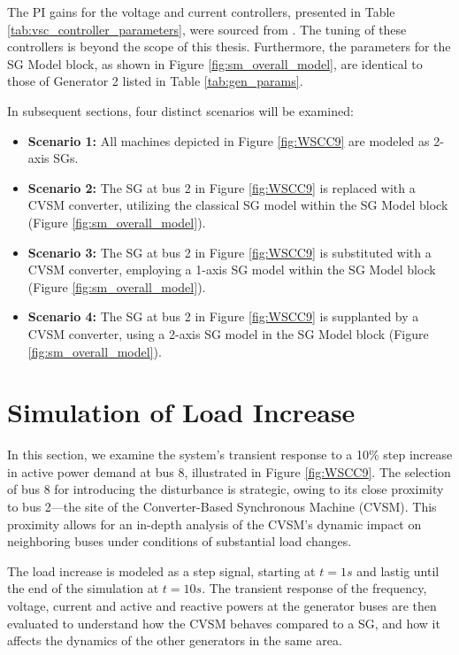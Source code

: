 The PI gains for the voltage and current controllers, presented in Table
\ref{tab:vsc_controller_parameters}, were sourced from \cite{du2020comparative}.
The tuning of these controllers is beyond the scope of this thesis. Furthermore,
the parameters for the SG Model block, as shown in Figure
\ref{fig:sm_overall_model}, are identical to those of Generator 2 listed in
Table \ref{tab:gen_params}.

In subsequent sections, four distinct scenarios will be examined:
\begin{itemize}
    \item \textbf{Scenario 1:} All machines depicted in Figure \ref{fig:WSCC9}
    are modeled as 2-axis SGs.
    \item \textbf{Scenario 2:} The SG at bus 2 in Figure \ref{fig:WSCC9} is
    replaced with a CVSM converter, utilizing the classical SG model within the
    SG Model block (Figure \ref{fig:sm_overall_model}).
    \item \textbf{Scenario 3:} The SG at bus 2 in Figure \ref{fig:WSCC9} is
    substituted with a CVSM converter, employing a 1-axis SG model within the SG
    Model block (Figure \ref{fig:sm_overall_model}).
    \item \textbf{Scenario 4:} The SG at bus 2 in Figure \ref{fig:WSCC9} is
    supplanted by a CVSM converter, using a 2-axis SG model in the SG Model
    block (Figure \ref{fig:sm_overall_model}).
\end{itemize}

\section{Simulation of Load Increase} \label{sec:load_increase}
In this section, we examine the system's transient response to a 10\% step
increase in active power demand at bus 8, illustrated in Figure \ref{fig:WSCC9}.
The selection of bus 8 for introducing the disturbance is strategic, owing to
its close proximity to bus 2—the site of the Converter-Based Synchronous Machine
(CVSM). This proximity allows for an in-depth analysis of the CVSM's dynamic
impact on neighboring buses under conditions of substantial load changes.

The load increase is modeled as a step signal, starting at $t=1s$ and lastig
until the end of the simulation at $t=10s$. The transient response of the
frequency, voltage, current and active and reactive powers at the generator
buses are then evaluated to understand how the CVSM behaves compared to a SG,
and how it affects the dynamics of the other generators in the same area.

